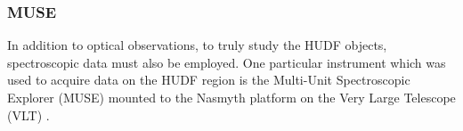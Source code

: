 \documentclass[12pt, twocolumn]{revtex4}    %
\begin{document}


\subsubsection{MUSE}

In addition to optical observations, to truly study the HUDF objects, spectroscopic data must also be employed. One particular instrument which was used to acquire data on the HUDF region is the Multi-Unit Spectroscopic Explorer (MUSE) mounted to the Nasmyth platform on the Very Large Telescope (VLT) \citep{bacon_muse_proposal}. 

\end{document}
